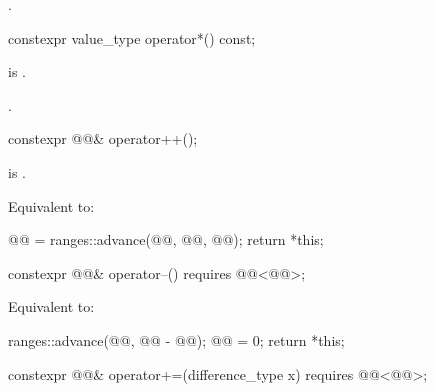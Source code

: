 \begin{itemdescr}
\pnum
\returns
{}.
\end{itemdescr}

%
\begin{itemdecl}
constexpr value_type operator*() const;
\end{itemdecl}

\begin{itemdescr}
\pnum
\expects
{} is .

\pnum
\returns
{}.
\end{itemdescr}

%
\begin{itemdecl}
constexpr @@& operator++();
\end{itemdecl}

\begin{itemdescr}
\pnum
\expects
{} is .

\pnum
\effects
Equivalent to:
\begin{codeblock}
@@ = ranges::advance(@@, @@, @@);
return *this;
\end{codeblock}
\end{itemdescr}

%
\begin{itemdecl}
constexpr @@& operator--() requires @@<@@>;
\end{itemdecl}

\begin{itemdescr}
\pnum
\effects
Equivalent to:
\begin{codeblock}
ranges::advance(@@, @@ - @@);
@@ = 0;
return *this;
\end{codeblock}
\end{itemdescr}

%
\begin{itemdecl}
constexpr @@& operator+=(difference_type x)
  requires @@<@@>;
\end{itemdecl}

